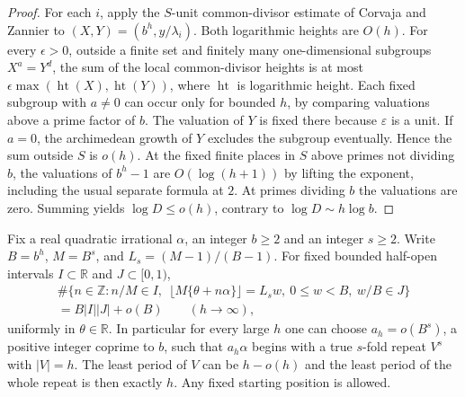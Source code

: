 \begin{proof}
For each $i$, apply the $S$-unit common-divisor estimate of Corvaja and Zannier \cite[Proposition~2 of the preprint]{CZ} to $(X,Y)=(b^h,y/\lambda_i)$. Both logarithmic heights are $O(h)$. For every $\epsilon>0$, outside a finite set and finitely many one-dimensional subgroups $X^a=Y^d$, the sum of the local common-divisor heights is at most $\epsilon\max(\operatorname{ht}(X),\operatorname{ht}(Y))$, where $\operatorname{ht}$ is logarithmic height. Each fixed subgroup with $a\ne0$ can occur only for bounded $h$, by comparing valuations above a prime factor of $b$. The valuation of $Y$ is fixed there because $\varepsilon$ is a unit. If $a=0$, the archimedean growth of $Y$ excludes the subgroup eventually. Hence the sum outside $S$ is $o(h)$. At the fixed finite places in $S$ above primes not dividing $b$, the valuations of $b^h-1$ are $O(\log(h+1))$ by lifting the exponent, including the usual separate formula at $2$. At primes dividing $b$ the valuations are zero. Summing yields $\log D\le o(h)$, contrary to $\log D\sim h\log b$.
\end{proof}

\begin{theorem}\label{thm:quadcount}
Fix a real quadratic irrational $\alpha$, an integer $b\ge2$ and an integer $s\ge2$. Write $B=b^h$, $M=B^s$, and $L_s=(M-1)/(B-1)$. For fixed bounded half-open intervals $I\subset\mathbb R$ and $J\subset[0,1)$,
\begin{multline}\label{eq:repeatcount}
 \#\bigl\{n\in\mathbb Z:n/M\in I,\ \
     \lfloor M\{\theta+n\alpha\}\rfloor=L_s w,\
     0\le w<B,\ w/B\in J\bigr\}\\
                     = B|I||J|+o(B)\qquad (h\to\infty),
\end{multline}
uniformly in $\theta\in\mathbb R$. In particular for every large $h$ one can choose $a_h=o(B^s)$, a positive integer coprime to $b$, such that $a_h\alpha$ begins with a true $s$-fold repeat $V^s$ with $|V|=h$. The least period of $V$ can be $h-o(h)$ and the least period of the whole repeat is then exactly $h$. Any fixed starting position is allowed.
\end{theorem}

